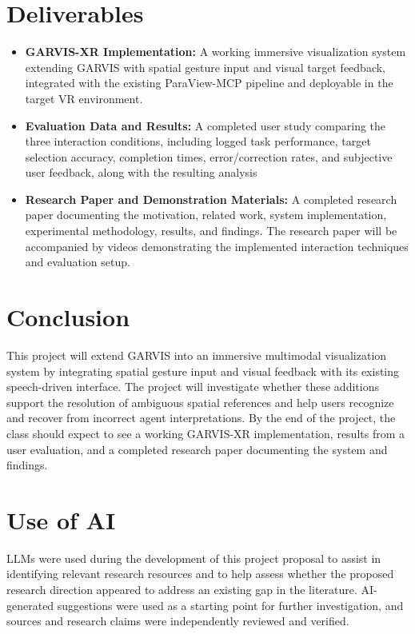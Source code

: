 \documentclass[sigconf,nonacm]{acmart}
\begin{document}
\section{Deliverables}
\label{sec:deliverables}

\begin{itemize}
\item \textbf{GARVIS-XR Implementation:} A working immersive visualization system extending GARVIS with spatial gesture input and visual target feedback, integrated with the existing ParaView-MCP pipeline and deployable in the target VR environment.
\item \textbf{Evaluation Data and Results:} A completed user study comparing the three interaction conditions, including logged task performance, target selection accuracy, completion times, error/correction rates, and subjective user feedback, along with the resulting analysis
\item \textbf{Research Paper and Demonstration Materials:} A completed research paper documenting the motivation, related work, system implementation, experimental methodology, results, and findings. The research paper will be accompanied by videos demonstrating the implemented interaction techniques and evaluation setup.
\end{itemize}


\section{Conclusion}

This project will extend GARVIS into an immersive multimodal visualization system by integrating spatial gesture input and visual feedback with its existing speech-driven interface. The project will investigate whether these additions support the resolution of ambiguous spatial references and help users recognize and recover from incorrect agent interpretations. By the end of the project, the class should expect to see a working GARVIS-XR implementation, results from a user evaluation, and a completed research paper documenting the system and findings. 


\section*{Use of AI}

LLMs were used during the development of this project proposal to assist in identifying relevant research resources and to help assess whether the proposed research direction appeared to address an existing gap in the literature. AI-generated suggestions were used as a starting point for further investigation, and sources and research claims were independently reviewed and verified. 




\end{document}
